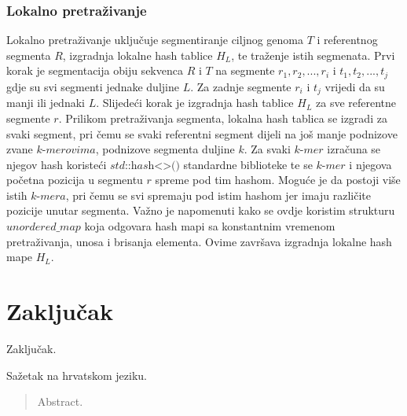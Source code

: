 \documentclass[times, utf8, diplomski]{fer}
\begin{document}
\subsection{Lokalno pretraživanje}
Lokalno pretraživanje uključuje segmentiranje ciljnog genoma $\textit{T}$ i referentnog segmenta $\textit{R}$, izgradnja lokalne hash tablice $\textit{H}_L$, te traženje istih segmenata. Prvi korak je segmentacija obiju sekvenca $\textit{R}$ i $\textit{T}$ na segmente $r_1, r_2,..., r_i$ i $t_1, t_2,..., t_j$ gdje su svi segmenti jednake duljine $L$.  Za zadnje segmente $r_i$ i $t_j$ vrijedi da su manji ili jednaki $L$. Slijedeći korak je izgradnja hash tablice $\textit{H}_L$ za sve referentne segmente $r$. Prilikom pretraživanja segmenta, lokalna hash tablica se izgradi za svaki segment, pri čemu se svaki referentni segment dijeli na još manje podnizove zvane $\textit{k-merovima}$, podnizove segmenta duljine $k$. Za svaki $\textit{k-mer}$ izračuna se njegov hash koristeći $\textit{std::hash<>()}$ standardne biblioteke te se $\textit{k-mer}$ i njegova početna pozicija u segmentu $r$ spreme pod tim hashom. Moguće je da postoji više istih $\textit{k-mera}$, pri čemu se svi spremaju pod istim hashom jer imaju različite pozicije unutar segmenta. Važno je napomenuti kako se ovdje koristim strukturu $\textit{unordered\_map}$ koja odgovara hash mapi sa konstantnim vremenom pretraživanja, unosa i brisanja elementa. Ovime završava izgradnja lokalne hash mape $\textit{H}_L$.

\chapter{Zaključak}
Zaključak.

\nocite{*}



\begin{sazetak}
Sažetak na hrvatskom jeziku.

\end{sazetak}

\begin{abstract}
Abstract.

\end{abstract}
\end{document}

